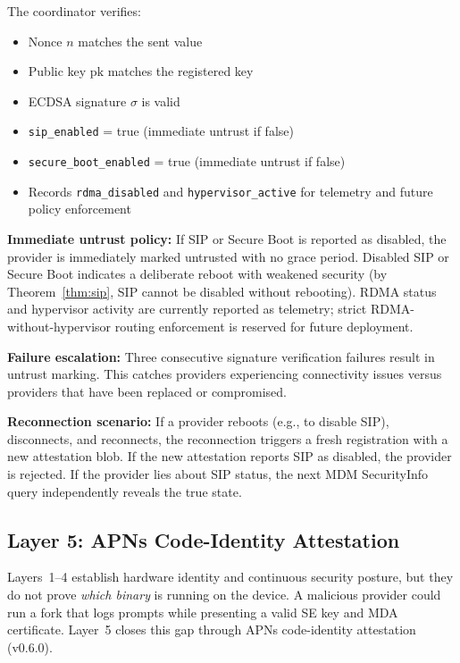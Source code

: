 \documentclass[10pt,twocolumn,letterpaper]{article}
\begin{document}
The coordinator verifies:
\begin{itemize}[leftmargin=*,itemsep=1pt]
    \item Nonce $n$ matches the sent value
    \item Public key $\text{pk}$ matches the registered key
    \item ECDSA signature $\sigma$ is valid
    \item \texttt{sip\_enabled} = true (immediate untrust if false)
    \item \texttt{secure\_boot\_enabled} = true (immediate untrust if false)
    \item Records \texttt{rdma\_disabled} and \texttt{hypervisor\_active} for telemetry and future policy enforcement
\end{itemize}

\textbf{Immediate untrust policy:} If SIP or Secure Boot is reported as disabled, the provider is immediately marked untrusted with no grace period. Disabled SIP or Secure Boot indicates a deliberate reboot with weakened security (by Theorem~\ref{thm:sip}, SIP cannot be disabled without rebooting). RDMA status and hypervisor activity are currently reported as telemetry; strict RDMA-without-hypervisor routing enforcement is reserved for future deployment.

\textbf{Failure escalation:} Three consecutive signature verification failures result in untrust marking. This catches providers experiencing connectivity issues versus providers that have been replaced or compromised.

\textbf{Reconnection scenario:} If a provider reboots (e.g., to disable SIP), disconnects, and reconnects, the reconnection triggers a fresh registration with a new attestation blob. If the new attestation reports SIP as disabled, the provider is rejected. If the provider lies about SIP status, the next MDM SecurityInfo query independently reveals the true state.

\subsection{Layer 5: APNs Code-Identity Attestation}
\label{sec:apns-attest}

Layers~1--4 establish hardware identity and continuous security posture, but they do not prove \emph{which binary} is running on the device. A malicious provider could run a fork that logs prompts while presenting a valid SE key and MDA certificate. Layer~5 closes this gap through APNs code-identity attestation (v0.6.0).
\end{document}
